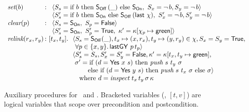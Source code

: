 {\begin{figure}[t]
%
\small
\[
\begin{array}{l@{\, :\ }l}
  \aux{set}(b) &
  \begin{array}[t]{l}
        \langle \sss = \textrm{if}\ b\ \textrm{then}\ \sOff\,(\_) \ 
        \textrm{else}\ \sOn,\ \sx = \neg\, b, \sy = \neg\, b \rangle\\
        \langle \sss' = \textrm{if}\ b\ \textrm{then}\ \sOn\ %
        \textrm{else}\ \sOff\,(\mathsf{last}\ \hist),\
         \sx' = \neg\, b, \sy' = \neg\, b \rangle
\end{array}\\[2.5pt] 
   \aux{clear}(p) &
  \begin{array}[t]{l}
   \langle\sss = \sOn,\ \spp = \FF \rangle\\
   \langle\sss' = \sOn,\ \spp' = \TT,\
     \CP = \C[\histp \hpts \mathsf{green}] \rangle
  \end{array}\\[2.5pt]
   \aux{relink}(r_x, r_y) & [t_x, t_y]\ldot
    \begin{array}[t]{l}
    \langle\sss = \sOff(\_), %
      t_x \hpts (x, r_x), t_y \hpts (y, r_y) \in \hist, \sx = \sy = \TT, \\
     \hphantom{\langle} \forall p \in \{x,y\}\ldot \lgVy\ p\, t_p \rangle\\
        \langle\sss' = \sss, \sx'= \sy'=\FF,%
        \CP = \C[t_x, t_y \hpts \mathsf{green}],\\
      \ \ordlist' = \textrm{if}\ (d = \mathsf{Yes}\ x\ s)\
                \textrm{then}\ \aux{push}\ s\ t_y\ \ordlist\\
                 \phantom{\ \ordlist =\ } \textrm{else\ if}\
                 (d = \mathsf{Yes}\ y\ s)\ \textrm{then}\
                 \aux{push}\ s\ t_x\ \ordlist\ \textrm{else}\ \ordlist\rangle\\
  \quad \mbox{where $d = \aux{inspect}\ t_x\, t_y\, \ordlist\, \C$}
  \end{array}
\end{array}
\]
\caption{\label{fig:auxcode} Auxiliary procedures for
\jywrite~and 
  \jyscan. Bracketed variables (\eg, $[t, v]$) are logical variables
  that scope over precondition and postcondition.}
\end{figure}
}

